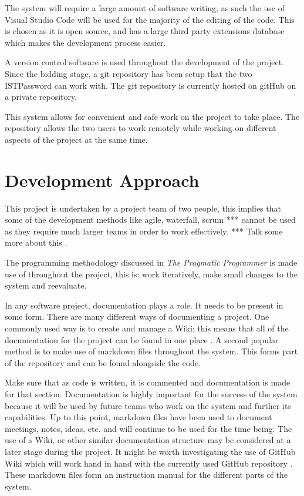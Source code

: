 \documentclass[12pt,onecolumn]{IEEEtran}
\begin{document}
The system will require a large amount of software writing, as such the use of Visual Studio Code will be used for the majority of the editing of the code. This is chosen as it is open source, and has a large third party extensions database which makes the development process easier. 

A version control software is used throughout the development of the project. Since the bidding stage, a git repository has been setup that the two ISTPassword can work with. The git repository is currently hosted on gitHub on a private repository. 

This system allows for convenient and safe work on the project to take place. The repository allows the two users to work remotely while working on different aspects of the project at the same time. 




\section{Development Approach} \label{sec:Development Approach}
This project is undertaken by a project team of two people, this implies that some of the development methods like agile, waterfall, scrum *** cannot be used as they require much larger teams in order to work effectively. 
*** Talk some more about this \cite{}.

The programming methodology discussed in \textit{The Pragmatic Programmer} is made use of throughout the project, this is: work iteratively, make small changes to the system and reevaluate. 

In any software project, documentation plays a role. It needs to be present in some form. There are many different ways of documenting a project. One commonly used way is to create and manage a Wiki; this means that all of the documentation for the project can be found in one place \cite{documentationpost}. 
A second popular method is to make use of markdown files throughout the system. This forms part of the repository and can be found alongside the code.

Make sure that as code is written, it is commented and documentation is made for that section. Documentation is highly important for the success of the system because it will be used by future teams who work on the system and further its capabilities. 
Up to this point, markdown files have been used to document meetings, notes, ideas, etc. and will continue to be used for the time being. The use of a Wiki, or other similar documentation structure may be considered at a later stage during the project. It might be worth investigating the use of GitHub Wiki which will work hand in hand with the currently used GitHub repository \cite{githubwiki}.
These markdown files form an instruction manual for the different parts of the system.
\end{document}
